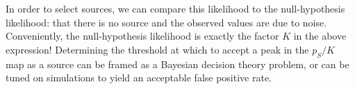\documentclass[11pt,letterpaper,linenumbers]{aastex63}
\newcommand{\erf}{\textrm{erf}}
\begin{document}



In order to select sources, we can compare this likelihood to the
null-hypothesis likelihood: that there is no source and the observed
values are due to noise.  Conveniently, the null-hypothesis likelihood
is exactly the factor $K$ in the above expression!  Determining the
threshold at which to accept a peak in the $p_S/K$ map as a source can
be framed as a Bayesian decision theory problem, or can be tuned on
simulations to yield an acceptable false positive rate.

\end{document}
